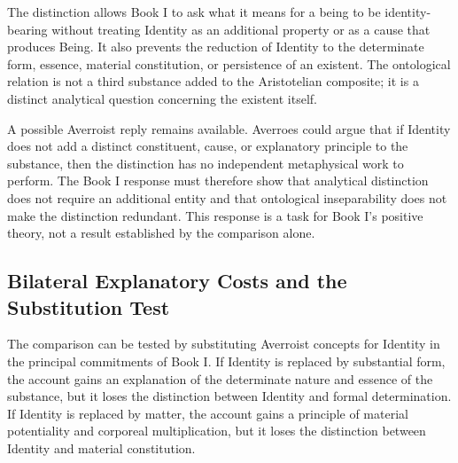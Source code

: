 The distinction allows Book I to ask
what it means for a being to be
identity-bearing without treating Identity
as an additional property or as a cause
that produces Being. It also prevents
the reduction of Identity to the determinate
form, essence, material constitution,
or persistence of an existent. The
ontological relation is not a third
substance added to the Aristotelian
composite; it is a distinct analytical
question concerning the existent itself.

\label{para:VS.B01.P01.C08.S15.SS15.P004}

A possible Averroist reply remains available.
Averroes could argue that if Identity does
not add a distinct constituent, cause,
or explanatory principle to the substance,
then the distinction has no independent
metaphysical work to perform. The Book I
response must therefore show that analytical
distinction does not require an additional
entity and that ontological inseparability
does not make the distinction redundant.
This response is a task for Book I's
positive theory, not a result established
by the comparison alone.



\subsection{Bilateral Explanatory Costs and the Substitution Test}
\label{subsec:ch08_s15_ss16}

\label{para:VS.B01.P01.C08.S15.SS16.P001}

The comparison can be tested by substituting
Averroist concepts for Identity in the
principal commitments of Book I. If
Identity is replaced by substantial form,
the account gains an explanation of the
determinate nature and essence of the
substance, but it loses the distinction
between Identity and formal determination.
If Identity is replaced by matter, the
account gains a principle of material
potentiality and corporeal multiplication,
but it loses the distinction between
Identity and material constitution.

\label{para:VS.B01.P01.C08.S15.SS16.P002}

